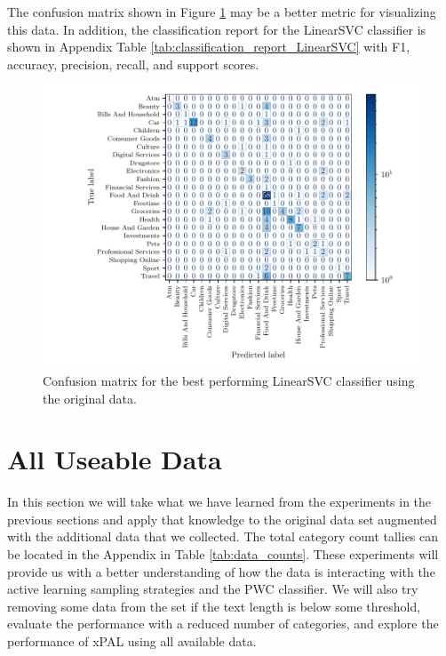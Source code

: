 The confusion matrix shown in Figure \ref{fig:confusion_matrix} may be a better metric for visualizing this data. In addition, the classification report for the LinearSVC classifier is shown in Appendix Table \ref{tab:classification_report_LinearSVC} with F1, accuracy, precision, recall, and support scores.

\begin{figure}[h]
  \centering
  \includegraphics[width=\scale\textwidth]{../img/plot_cm_LinearSVC.pdf}
  \caption{Confusion matrix for the best performing LinearSVC classifier using the original data.}
  \label{fig:confusion_matrix}
\end{figure}


\section{All Useable Data}
\label{sec:proper_vectorization}

In this section we will take what we have learned from the experiments in the previous sections and apply that knowledge to the original data set augmented with the additional data that we collected. The total category count tallies can be located in the Appendix in Table \ref{tab:data_counts}. These experiments will provide us with a better understanding of how the data is interacting with the active learning sampling strategies and the PWC classifier. We will also try removing some data from the set if the text length is below some threshold, evaluate the performance with a reduced number of categories, and explore the performance of xPAL using all available data.

